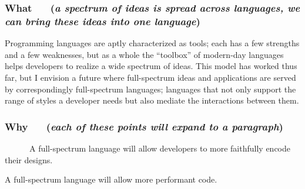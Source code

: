 \documentclass{article}
\begin{document}





\subsubsection*{What ~~ (\emph{a spectrum of ideas is spread across languages, we can bring these ideas into one language})}
Programming languages are aptly characterized as tools; each has a few strengths and a few weaknesses, but as a whole the ``toolbox'' of modern-day languages helps developers to realize a wide spectrum of ideas.
This model has worked thus far, but I envision a future where full-spectrum ideas and applications are served by correspondingly full-spectrum languages; languages that not only support the range of styles a developer needs but also mediate the interactions between them.

\vfill{}
\subsubsection*{Why ~~ (\emph{each of these points will expand to a paragraph})}

~~~~~~A full-spectrum language will allow developers to more faithfully encode their designs. %

A full-spectrum language will allow more performant code.
\end{document}
